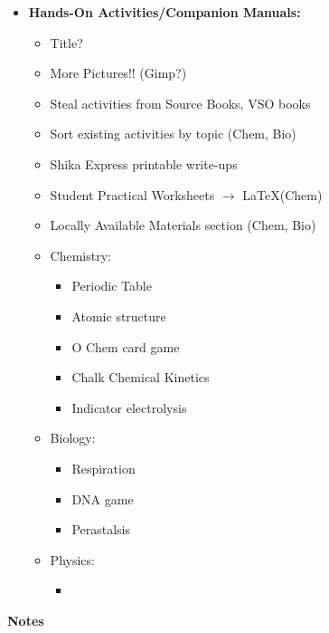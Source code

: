 \begin{itemize}
\item \textbf{Hands-On Activities\slash Companion Manuals:}
\begin{itemize}
\item Title?
\item More Pictures!! (Gimp?)
\item Steal activities from Source Books, VSO books
\item Sort existing activities by topic (Chem, Bio)
\item Shika Express printable write-ups
\item Student Practical Worksheets $\rightarrow$ \LaTeX (Chem)
\item Locally Available Materials section (Chem, Bio) 
\item Chemistry:
\begin{itemize}
\item Periodic Table
\item Atomic structure
\item O Chem card game
\item Chalk Chemical Kinetics
\item Indicator electrolysis
\end{itemize}
\item Biology:
\begin{itemize}
\item Respiration
\item DNA game
\item Perastalsis
\end{itemize}
\item Physics:
\begin{itemize}
\item 
\end{itemize}
\end{itemize}


\end{itemize}

\pagebreak

\Huge{\textbf{Notes}}